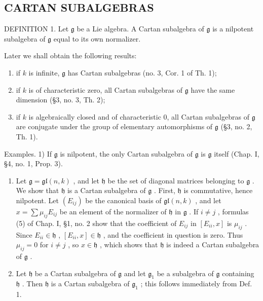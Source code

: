 \subsection{CARTAN SUBALGEBRAS}

DEFINITION 1. Let \(\mathfrak{g}\) be a Lie algebra. A Cartan subalgebra of \(\mathfrak{g}\) is a nilpotent subalgebra of \(\mathfrak{g}\) equal to its own normalizer.

Later we shall obtain the following results:

\begin{enumerate}
\def\labelenumi{\arabic{enumi})}
\item
  if \(k\) is infinite, \(\mathfrak{g}\) has Cartan subalgebras (no. 3, Cor. 1 of Th. 1);
\item
  if \(k\) is of characteristic zero, all Cartan subalgebras of \(\mathfrak{g}\) have the same dimension (§3, no. 3, Th. 2);
\item
  if \(k\) is algebraically closed and of characteristic 0, all Cartan subalgebras of \(\mathfrak{g}\) are conjugate under the group of elementary automorphisms of \(\mathfrak{g}\) (§3, no. 2, Th. 1).
\end{enumerate}

Examples. 1) If \(\mathfrak{g}\) is nilpotent, the only Cartan subalgebra of \(\mathfrak{g}\) is \(\mathfrak{g}\) itself (Chap. I, §4, no. 1, Prop. 3).

\begin{enumerate}
\def\labelenumi{\arabic{enumi})}
\setcounter{enumi}{1}
\item
  Let \(\mathfrak{g} = \mathfrak{gl}(n,k)\) , and let \(\mathfrak{h}\) be the set of diagonal matrices belonging to \(\mathfrak{g}\) . We show that \(\mathfrak{h}\) is a Cartan subalgebra of \(\mathfrak{g}\) . First, \(\mathfrak{h}\) is commutative, hence nilpotent. Let \((E_{ij})\) be the canonical basis of \(\mathfrak{gl}(n,k)\) , and let \(x = \sum \mu_{ij}E_{ij}\) be an element of the normalizer of \(\mathfrak{h}\) in \(\mathfrak{g}\) . If \(i\neq j\) , formulas (5) of Chap. I, §1, no. 2 show that the coefficient of \(E_{ij}\) in \([E_{ii},x]\) is \(\mu_{ij}\) . Since \(E_{ii}\in \mathfrak{h}\) , \([E_{ii},x]\in \mathfrak{h}\) , and the coefficient in question is zero. Thus \(\mu_{ij} = 0\) for \(i\neq j\) , so \(x\in \mathfrak{h}\) , which shows that \(\mathfrak{h}\) is indeed a Cartan subalgebra of \(\mathfrak{g}\) .
\item
  Let \(\mathfrak{h}\) be a Cartan subalgebra of \(\mathfrak{g}\) and let \(\mathfrak{g}_1\) be a subalgebra of \(\mathfrak{g}\) containing \(\mathfrak{h}\) . Then \(\mathfrak{h}\) is a Cartan subalgebra of \(\mathfrak{g}_1\) ; this follows immediately from Def. 1.
\end{enumerate}

